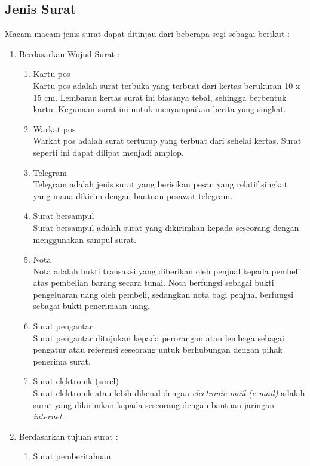 \subsection{Jenis Surat}
\label{sec:jenis_surat}
Macam-macam jenis surat dapat ditinjau dari beberapa segi sebagai berikut : 
\begin{enumerate}
	\item Berdasarkan Wujud Surat : 
	\begin{enumerate}
		\item Kartu pos \\
		Kartu pos adalah surat terbuka yang terbuat dari kertas berukuran 10 x 15 cm. Lembaran kertas surat ini biasanya tebal, sehingga berbentuk kartu. Kegunaan surat ini untuk menyampaikan berita yang singkat. 
		\item Warkat pos \\
		Warkat pos adalah surat tertutup yang terbuat dari sehelai kertas. Surat seperti ini dapat dilipat menjadi amplop.
		\item Telegram \\
		Telegram adalah jenis surat yang berisikan pesan yang relatif singkat yang mana dikirim dengan bantuan pesawat telegram.
		\item Surat bersampul \\
		Surat bersampul adalah surat yang dikirimkan kepada seseorang dengan menggunakan sampul surat. 
		\item Nota \\
		Nota adalah bukti transaksi yang diberikan oleh penjual kepada pembeli atas pembelian barang secara tunai. Nota berfungsi sebagai bukti pengeluaran uang oleh pembeli, sedangkan nota bagi penjual berfungsi sebagai bukti penerimaan uang.
		\item Surat pengantar \\
		Surat pengantar ditujukan kepada perorangan atau lembaga sebagai pengatur atau referensi seseorang untuk berhubungan dengan pihak penerima surat.
		\item Surat elektronik (surel) \\
		Surat elektronik atau lebih dikenal dengan \textit{electronic mail (e-mail)} adalah surat yang dikirimkan kepada seseorang dengan bantuan jaringan \textit{internet}.
	\end{enumerate}
	\item Berdasarkan tujuan surat :
	\begin{enumerate}
		\item Surat pemberitahuan \\

\end{enumerate}
\end{enumerate}
